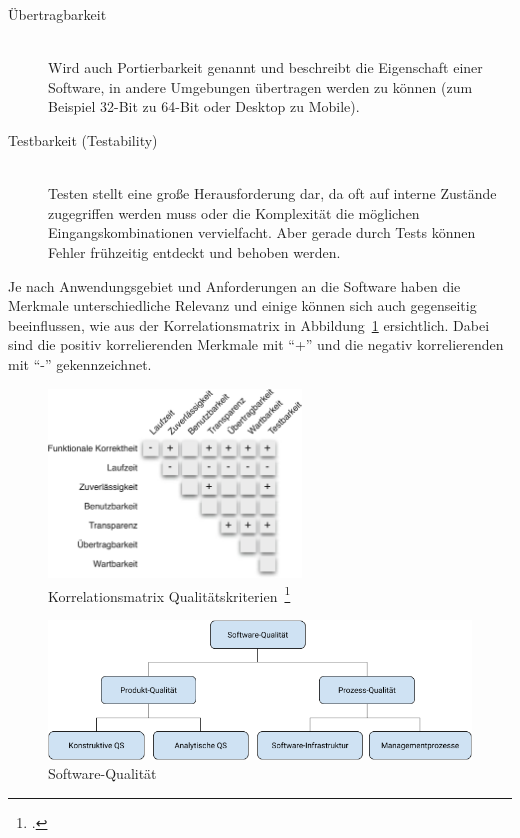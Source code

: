 \begin{description}
\begin{description}
    \item[Übertragbarkeit] \hfill \\ Wird auch Portierbarkeit genannt und beschreibt die Eigenschaft einer Software, in andere Umgebungen übertragen werden zu können (zum Beispiel 32-Bit zu 64-Bit oder Desktop zu Mobile).
    \item[Testbarkeit (Testability)] \hfill \\ Testen stellt eine große Herausforderung dar, da oft auf interne Zustände zugegriffen werden muss oder die Komplexität die möglichen Eingangskombinationen vervielfacht. Aber gerade durch Tests können Fehler frühzeitig entdeckt und behoben werden.
  \end{description}
\end{description}

Je nach Anwendungsgebiet und Anforderungen an die Software haben die Merkmale unterschiedliche Relevanz und einige können sich auch gegenseitig beeinflussen, wie aus der Korrelationsmatrix in Abbildung~\ref{fig:korrelationsmatrix} ersichtlich.
Dabei sind die positiv korrelierenden Merkmale mit ``+'' und die negativ korrelierenden mit ``-'' gekennzeichnet.

\begin{savenotes}
  \begin{figure}[H] 
    \centering
       \includegraphics[width=0.6\textwidth]{img/korrelationsmatrix-kriterien.png}
    \caption[Korrelationsmatrix Qualitätskriterien]{Korrelationsmatrix Qualitätskriterien~\footcite[][S. 11, Abb. 1.3]{hoffmann_software_qualitat_2013}}\label{fig:korrelationsmatrix}
  \end{figure}
\end{savenotes}

\begin{savenotes}
  \begin{figure}[H] 
    \centering
       \includegraphics[width=1.0\textwidth]{img/software-quality.png}
    \caption[Software-Qualität]{Software-Qualität}\label{fig:software-quality}
  \end{figure}
\end{savenotes}

